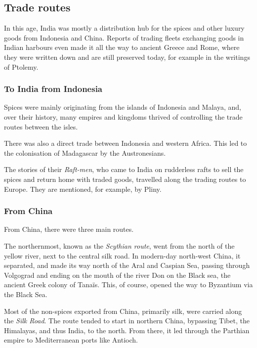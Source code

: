 \documentclass[11pt, a4paper, headings=standardclasses]{scrartcl}
\begin{document}
\subsection{Trade routes}
In this age, India was mostly a distribution hub for the spices and other luxury goods from Indonesia and China. Reports of trading fleets exchanging goods in Indian harbours even made it all the way to ancient Greece and Rome, where they were written down and are still preserved today, for example in the writings of Ptolemy.\autocite[p.~148-150]{Rome}

\subsubsection{To India from Indonesia}

Spices were mainly originating from the islands of Indonesia and Malaya, and, over their history, many empires and kingdoms thrived of controlling the trade routes between the isles.\autocite{Indonesia}

There was also a direct trade between Indonesia and western Africa. This led to the colonisation of Madagascar by the Austronesians.\autocite{Madagascar}

The stories of their \emph{Raft-men}, who came to India on rudderless rafts to sell the spices and return home with traded goods, travelled along the trading routes to Europe. They are mentioned, for example, by Pliny.\autocite[Chapter 8]{Rome}

\subsubsection{From China}

From China, there were three main routes.

The northernmost, known as the \emph{Scythian route}, went from the north of the yellow river, next to the central silk road. In modern-day north-west China, it separated, and made its way north of the Aral and Caspian Sea, passing through Volgograd and ending on the mouth of the river Don on the Black sea, the ancient Greek colony of Tana\"{i}s. This, of course, opened the way to Byzantium via the Black Sea.\autocite[149]{Rome}

Most of the non-spices exported from China, primarily silk, were carried along the \emph{Silk Road}. The route tended to start in northern China, bypassing Tibet, the Himalayas, and thus India, to the north. From there, it led through the Parthian empire\autocite{SilkRome} to Mediterranean ports like Antioch.\autocite[Chapter 7, Maps 2 and 3]{Rome}
\end{document}
